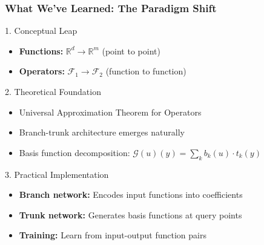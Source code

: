 \documentclass[notes]{beamer}
\begin{document}
\begin{frame}
\frametitle{What We've Learned: The Paradigm Shift}

\begin{block}{1. Conceptual Leap}
\begin{itemize}
    \item \textbf{Functions:} $\mathbb{R}^d \rightarrow \mathbb{R}^m$ (point to point)
    \item \textbf{Operators:} $\mathcal{F}_1 \rightarrow \mathcal{F}_2$ (function to function)
\end{itemize}
\end{block}

\begin{block}{2. Theoretical Foundation}
\begin{itemize}
    \item Universal Approximation Theorem for Operators
    \item Branch-trunk architecture emerges naturally
    \item Basis function decomposition: $\mathcal{G}(u)(y) = \sum_k b_k(u) \cdot t_k(y)$
\end{itemize}
\end{block}

\begin{block}{3. Practical Implementation}
\begin{itemize}
    \item \textbf{Branch network:} Encodes input functions into coefficients
    \item \textbf{Trunk network:} Generates basis functions at query points
    \item \textbf{Training:} Learn from input-output function pairs
\end{itemize}
\end{block}

\end{frame}
\end{document}
